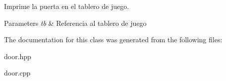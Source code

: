 Imprime la puerta en el tablero de juego. 


\begin{DoxyParams}{Parameters}
{\em tb} & Referencia al tablero de juego \\
\hline
\end{DoxyParams}


The documentation for this class was generated from the following files\-:\begin{DoxyCompactItemize}
\item 
door.\-hpp\item 
door.\-cpp\end{DoxyCompactItemize}
